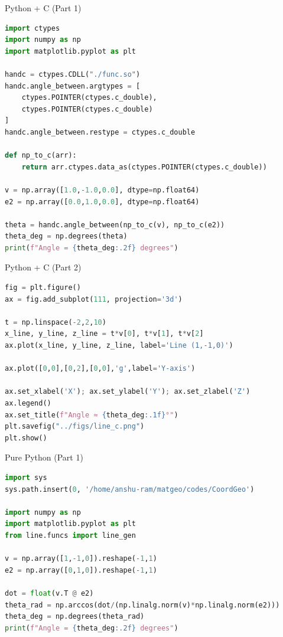 \documentclass{beamer}
\begin{document}
\begin{frame}[fragile]{Python + C (Part 1)}
\begin{lstlisting}[language=Python]
import ctypes
import numpy as np
import matplotlib.pyplot as plt

handc = ctypes.CDLL("./func.so")
handc.angle_between.argtypes = [
    ctypes.POINTER(ctypes.c_double),
    ctypes.POINTER(ctypes.c_double)
]
handc.angle_between.restype = ctypes.c_double

def np_to_c(arr):
    return arr.ctypes.data_as(ctypes.POINTER(ctypes.c_double))

v = np.array([1.0,-1.0,0.0], dtype=np.float64)
e2 = np.array([0.0,1.0,0.0], dtype=np.float64)

theta = handc.angle_between(np_to_c(v), np_to_c(e2))
theta_deg = np.degrees(theta)
print(f"Angle = {theta_deg:.2f} degrees")
\end{lstlisting}
\end{frame}

\begin{frame}[fragile]{Python + C (Part 2)}
\begin{lstlisting}[language=Python]
fig = plt.figure()
ax = fig.add_subplot(111, projection='3d')

t = np.linspace(-2,2,10)
x_line, y_line, z_line = t*v[0], t*v[1], t*v[2]
ax.plot(x_line, y_line, z_line, label='Line (1,-1,0)')

ax.plot([0,0],[0,2],[0,0],'g',label='Y-axis')

ax.set_xlabel('X'); ax.set_ylabel('Y'); ax.set_zlabel('Z')
ax.legend()
ax.set_title(f"Angle ≈ {theta_deg:.1f}°")
plt.savefig("../figs/line_c.png")
plt.show()
\end{lstlisting}
\end{frame}

\begin{frame}[fragile]{Pure Python (Part 1)}
\begin{lstlisting}[language=Python]
import sys
sys.path.insert(0, '/home/anshu-ram/matgeo/codes/CoordGeo')

import numpy as np
import matplotlib.pyplot as plt
from line.funcs import line_gen

v = np.array([1,-1,0]).reshape(-1,1)
e2 = np.array([0,1,0]).reshape(-1,1)

dot = float(v.T @ e2)
theta_rad = np.arccos(dot/(np.linalg.norm(v)*np.linalg.norm(e2)))
theta_deg = np.degrees(theta_rad)
print(f"Angle = {theta_deg:.2f} degrees")
\end{lstlisting}
\end{frame}
\end{document}
